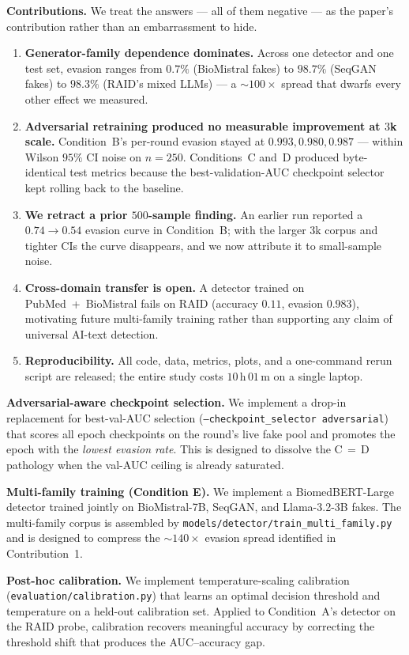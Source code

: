 \textbf{Contributions.} We treat the answers — all of them negative — as the
paper's contribution rather than an embarrassment to hide.
\begin{enumerate}[leftmargin=*]
\item \textbf{Generator-family dependence dominates.} Across one detector
  and one test set, evasion ranges from \(0.7\%\) (BioMistral fakes) to
  \(98.7\%\) (SeqGAN fakes) to \(98.3\%\) (RAID's mixed LLMs) — a
  \(\sim\!100\times\) spread that dwarfs every other effect we measured.
\item \textbf{Adversarial retraining produced no measurable improvement at
  \(3\)k scale.} Condition~B's per-round evasion stayed at
  \(0.993, 0.980, 0.987\) — within Wilson \(95\%\) CI noise on \(n=250\).
  Conditions~C and~D produced byte-identical test metrics because the
  best-validation-AUC checkpoint selector kept rolling back to the
  baseline.
\item \textbf{We retract a prior \(500\)-sample finding.} An earlier run
  reported a \(0.74 \to 0.54\) evasion curve in Condition~B; with the
  larger \(3\)k corpus and tighter CIs the curve disappears, and we now
  attribute it to small-sample noise.
\item \textbf{Cross-domain transfer is open.} A detector trained on
  PubMed~+~BioMistral fails on RAID (accuracy \(0.11\), evasion \(0.983\)),
  motivating future multi-family training rather than supporting any claim
  of universal AI-text detection.
\item \textbf{Reproducibility.} All code, data, metrics, plots, and a
  one-command rerun script are released; the entire study costs
  \(10\,\mathrm{h}\,01\,\mathrm{m}\) on a single laptop.
\end{enumerate}

\item \textbf{Adversarial-aware checkpoint selection.} We implement a
  drop-in replacement for best-val-AUC selection
  (\texttt{--checkpoint\_selector adversarial}) that scores all epoch
  checkpoints on the round's live fake pool and promotes the epoch with the
  \emph{lowest evasion rate}. This is designed to dissolve the C\,$=$\,D
  pathology when the val-AUC ceiling is already saturated.
\item \textbf{Multi-family training (Condition E).} We implement a
  BiomedBERT-Large detector trained jointly on BioMistral-7B, SeqGAN, and
  Llama-3.2-3B fakes. The multi-family corpus is assembled by
  \texttt{models/detector/train\_multi\_family.py} and is designed to
  compress the \(\sim\!140\times\) evasion spread identified in
  Contribution~1.
\item \textbf{Post-hoc calibration.} We implement temperature-scaling
  calibration~\cite{guo2017calibration}
  (\texttt{evaluation/calibration.py}) that learns an optimal decision
  threshold and temperature on a held-out calibration set. Applied to
  Condition~A's detector on the RAID probe, calibration recovers meaningful
  accuracy by correcting the threshold shift that produces the
  AUC--accuracy gap.

